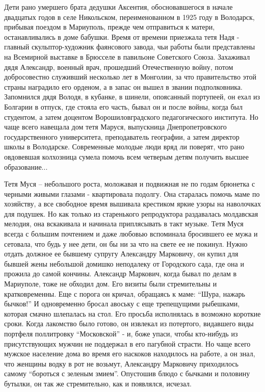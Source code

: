 Дети рано умершего брата дедушки Аксентия, обосновавшегося в начале двадцатых
годов в селе Никольском, переименованном в 1925 году в Володарск, прибывая
поездом в Мариуполь, прежде чем отправиться к матери, останавливались в доме
бабушки. Время от времени приезжала тетя Надя - главный скульптор-художник
фаянсового завода, чьи работы были представлены на Всемирной выставке в
Брюсселе в павильоне Советского Союза. Захаживал дядя Александр, военный врач,
прошедший Отечественную войну, потом добросовестно служивший несколько лет в
Монголии, за что правительство этой страны наградило его орденом, а в запас он
вышел в звании подполковника. Запомнился дядя Володя, в кубанке, в шинели,
опоясанный портупеей, он ехал из Болгарии в отпуск, где стояла его часть, бывал
он и после войны, когда был студентом, а затем доцентом Ворошиловградского
педагогического института. Но чаще всего навещала дом тетя Маруся, выпускница
Днепропетровского государственного университета, преподаватель географии, а
затем директор школы в Володарске.  Современные молодые люди вряд ли поверят,
что рано овдовевшая колхозница сумела помочь всем четверым детям получить
высшее образование... 

Тетя Муся – небольшого роста, моложавая и подвижная не по годам брюнетка с
черными живыми глазами - квартировала подолгу. Она старалась помочь маме по
хозяйству, а все свободное время вышивала крестиком яркие узоры на наволочках
для подушек. Но как только из старенького репродуктора раздавалась молдавская
мелодия, она вскакивала и начинала приплясывать в такт музыке. Тетя Муся всегда
с большим почтением и даже любовью вспоминала бросившего ее мужа и сетовала,
что будь у нее дети, он бы ни за что на свете ее не покинул. Нужно отдать
должное ее бывшему супругу Александру Марковичу, он купил для бывшей жены
небольшой домишко неподалеку от Городского сада, где она и прожила до самой
кончины. Александр Маркович, когда бывал по делам в Мариуполе, тоже не обходил
дом. Его визиты были стремительны и кратковременны. Еще с порога он кричал,
обращаясь к маме: \enquote{Шура, нажарь бычков!} И одновременно бросал авоську с еще
трепещущими рыбешками, которая смачно шлепалась на стол. Его просьба
исполнялась в возможно короткие сроки. Когда лакомство было готово, он извлекал
из потертого, видавшего виды портфеля поллитровку \enquote{Московской} - и, боже упаси,
чтобы кто-нибудь из присутствующих мужчин не поддержал в его пагубной страсти.
Но чаще всего мужское население дома во время его наскоков находилось на
работе, а он знал, что женщины водку в рот не возьмут, Александру Марковичу
приходилось самому \enquote{бороться с зеленым змием}. Опустошив блюдо с бычками и
половину бутылки, он так же стремительно, как и появлялся, исчезал.

